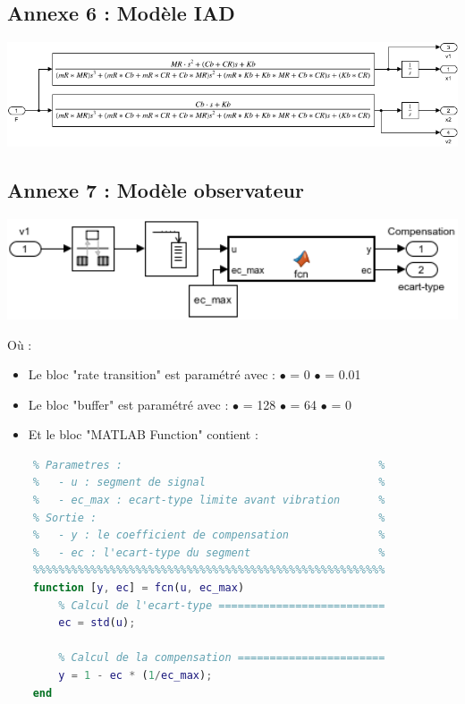 \documentclass[a4paper,12pt]{article}
\begin{document}
    \subsection{Annexe 6 : Modèle IAD} \label{Annexe:modelIAD}
    \begin{center}
        \includegraphics[width=16cm]{./img/model_IAD.png}
    \end{center}
    

    \subsection{Annexe 7 : Modèle observateur} \label{Annexe:modelObs}
    \begin{center}
        \includegraphics[width=14cm]{./img/model_observateur.png}
    \end{center}
    Où :
    \begin{itemize}
        \item[] Le bloc "rate transition" est paramétré avec : 
            \subitem $\bullet$  = 0
            \subitem $\bullet$  = 0.01
        \item[] Le bloc "buffer" est paramétré avec : 
            \subitem$\bullet$  = 128
            \subitem$\bullet$  = 64
            \subitem$\bullet$  = 0
        \item[] Et le bloc "MATLAB Function" contient :
    \end{itemize}
    \begin{lstlisting}[caption={Fonction simulink de calcul du compensateur}, language=Matlab]
    %%%%%%%%%%%%%%%%%%%%%%%%%%%%%%%%%%%%%%%%%%%%%%%%%%%%%%%
    % Parametres :                                        %
    %   - u : segment de signal                           %
    %   - ec_max : ecart-type limite avant vibration      %
    % Sortie :                                            %
    %   - y : le coefficient de compensation              %
    %   - ec : l'ecart-type du segment                    %
    %%%%%%%%%%%%%%%%%%%%%%%%%%%%%%%%%%%%%%%%%%%%%%%%%%%%%%%
    function [y, ec] = fcn(u, ec_max)
        % Calcul de l'ecart-type ==========================
        ec = std(u);

        % Calcul de la compensation =======================
        y = 1 - ec * (1/ec_max);
    end
    \end{lstlisting}
    
\end{document}
